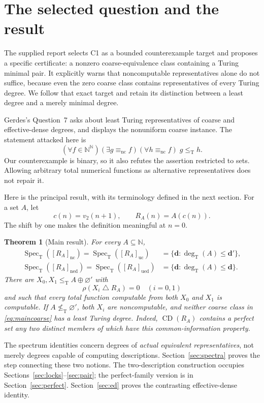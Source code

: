 \documentclass[11pt,a4paper]{article}
\newcommand{\N}{\mathbb N}
\newcommand{\Baire}{\N^{\N}}
\newcommand{\leT}{\leq_{\mathrm T}}
\newcommand{\nleT}{\nleq_{\mathrm T}}
\newcommand{\degT}{\operatorname{deg}_{\mathrm T}}
\newcommand{\Spec}{\operatorname{Spec}_{\mathrm T}}
\newcommand{\CD}{\operatorname{CD}}
\newcommand{\nc}{\mathrm{nc}}
\newcommand{\uc}{\mathrm{uc}}
\newcommand{\ned}{\mathrm{ned}}
\newcommand{\ued}{\mathrm{ued}}
\newcommand{\ddeg}{\mathbf d}
\newtheorem{theorem}{Theorem}[section]
\theoremstyle{definition}\newtheorem{definition}[theorem]{Definition}
\theoremstyle{remark}\newtheorem{remark}[theorem]{Remark}
\begin{document}
\section{The selected question and the result}
\label{sec:target}
The supplied report selects C1 as a bounded counterexample target and proposes a specific certificate: a nonzero coarse-equivalence class containing a Turing minimal pair. It explicitly warns that noncomputable representatives alone do not suffice, because even the zero coarse class contains representatives of every Turing degree. We follow that exact target and retain its distinction between a least degree and a merely minimal degree.\cite{Input}

Gerdes's Question~7 asks about least Turing representatives of coarse and effective-dense degrees, and displays the nonuniform coarse instance.\cite[Question~7]{Gerdes} The statement attacked here is
\begin{equation}\label{eq:C1}
 (\forall f\in\Baire)(\exists g\equiv_\nc f)
 (\forall h\equiv_\nc f)\;g\leT h.
\end{equation}
Our counterexample is binary, so it also refutes the assertion restricted to sets. Allowing arbitrary total numerical functions as alternative representatives does not repair it.

Here is the principal result, with its terminology defined in the next section. For a set $A$, let
\[
 c(n)=v_2(n+1),\qquad R_A(n)=A(c(n)).
\]
The shift by one makes the definition meaningful at $n=0$.

\begin{theorem}[Main result]\label{thm:main}
For every $A\subseteq\N$,
\begin{align}
 \Spec([R_A]_\nc)=\Spec([R_A]_\uc)
   &=\{\ddeg:\degT(A)\leq\ddeg'\},\label{eq:maincoarse}\\
 \Spec([R_A]_\ned)=\Spec([R_A]_\ued)
   &=\{\ddeg:\degT(A)\leq\ddeg\}.\label{eq:mained}
\end{align}
There are $X_0,X_1\leT A\oplus\varnothing'$ with
\[
 \rho(X_i\mathbin\triangle R_A)=0\quad(i=0,1)
\]
and such that every total function computable from both $X_0$ and $X_1$ is computable. If $A\nleT\varnothing'$, both $X_i$ are noncomputable, and neither coarse class in \eqref{eq:maincoarse} has a least Turing degree. Indeed, $\CD(R_A)$ contains a perfect set any two distinct members of which have this common-information property.
\end{theorem}

The spectrum identities concern degrees of \emph{actual equivalent representatives}, not merely degrees capable of computing descriptions. Section~\ref{sec:spectra} proves the step connecting these two notions. The two-description construction occupies Sections~\ref{sec:locks}--\ref{sec:pair}; the perfect-family version is in Section~\ref{sec:perfect}. Section~\ref{sec:ed} proves the contrasting effective-dense identity.
\end{document}
